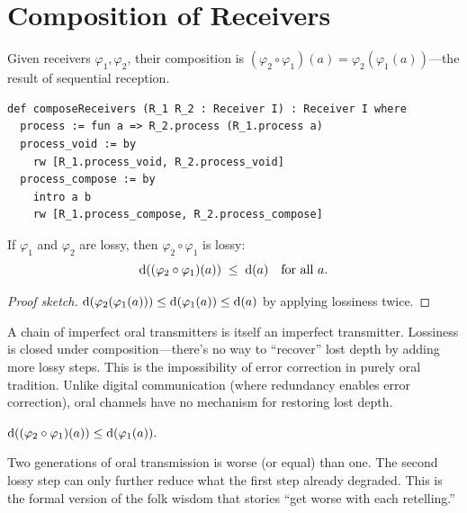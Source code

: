 \section{Composition of Receivers}
\label{sec:lossy-composition}

\begin{definition}
\label{def:compose-receivers}
Given receivers $\varphi_1,\varphi_2$, their composition is
$(\varphi_2\circ\varphi_1)(a) = \varphi_2(\varphi_1(a))$---the result of
sequential reception.
\end{definition}

\begin{lstlisting}[caption={Receiver composition in Lean~4.}]
def composeReceivers (R_1 R_2 : Receiver I) : Receiver I where
  process := fun a => R_2.process (R_1.process a)
  process_void := by
    rw [R_1.process_void, R_2.process_void]
  process_compose := by
    intro a b
    rw [R_1.process_compose, R_2.process_compose]
\end{lstlisting}

\begin{theorem}
\label{thm:compose-lossy}
If $\varphi_1$ and $\varphi_2$ are lossy, then
$\varphi_2\circ\varphi_1$ is lossy:
\[
  \operatorname{d}((\varphi_2\circ\varphi_1)(a)) \;\le\; \operatorname{d}(a)
  \quad\text{for all } a.
\]
\end{theorem}

\begin{proof}[Proof sketch]
$\operatorname{d}(\varphi_2(\varphi_1(a)))\le\operatorname{d}(\varphi_1(a))\le\operatorname{d}(a)$
by applying lossiness twice.
\end{proof}

A chain of imperfect oral transmitters is itself an imperfect transmitter.
Lossiness is closed under composition---there's no way to ``recover'' lost
depth by adding more lossy steps.  This is the impossibility of error
correction in purely oral tradition.  Unlike digital communication (where
redundancy enables error correction), oral channels have no mechanism for
restoring lost depth.

\begin{theorem}
\label{thm:double-lossy}
$\operatorname{d}((\varphi_2\circ\varphi_1)(a)) \le \operatorname{d}(\varphi_1(a)).$
\end{theorem}

Two generations of oral transmission is worse (or equal) than one.  The
second lossy step can only further reduce what the first step already
degraded.  This is the formal version of the folk wisdom that stories ``get
worse with each retelling.''


